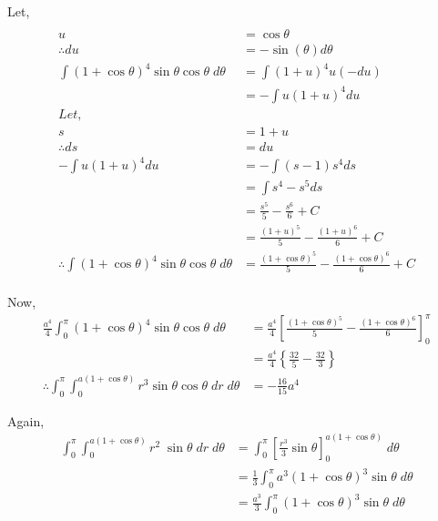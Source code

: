\documentclass{article}
\begin{document}
{Let,
\begin{align*}											& \\
    u															& = \cos \theta \\
    \therefore du												& = -\sin (\theta) d\theta \\
    \int (1+\cos \theta)^4 \sin \theta \cos \theta \; d\theta
    & = \int (1+u)^4 u (-du) \\
    & = -\int u(1+u)^4 du \\
    Let, \quad\quad												& \\
    s															& = 1+u \\
    \therefore ds												& = du \\
    -\int u(1+u)^4 du											& = -\int (s-1)s^4 ds \\
                                                                & = \int s^4 - s^5 ds \\
                                                                & = \frac{s^5}{5} - \frac{s^6}{6} + C \\
                                                                & = \frac{(1+u)^5}{5} - \frac{(1+u)^6}{6} + C \\
    \therefore \int (1+\cos \theta)^4 \sin \theta \cos \theta \; d\theta
                                                                & = \frac{(1+\cos \theta)^5}{5} - \frac{(1+\cos \theta)^6}{6} + C \\
\end{align*}

Now,
\begin{align*}
    \frac{a^4}{4} \int^\pi_0 (1+\cos \theta)^4 \sin \theta \cos \theta \; d\theta
    & = \frac{a^4}{4} \left[ \frac{(1+\cos \theta)^5}{5} - \frac{(1+\cos \theta)^6}{6} \right]^\pi_0 \\
    & = \frac{a^4}{4} \left\{ \frac{32}{5} - \frac{32}{3} \right\} \\
    \therefore \int^\pi_0 \int^{a(1+\cos \theta)}_0 r^3 \sin \theta \cos \theta \; dr \; d\theta
    & = -\frac{16}{15} a^4
\end{align*}

Again,
\begin{align*}
    \int^\pi_0 \int^{a(1+\cos \theta)}_0 r^2 \; \sin \theta \; dr \; d\theta
    & = \int^\pi_0 \left[ \frac{r^3}{3} \sin \theta \right]^{a(1+\cos \theta)}_0 \; d\theta \\
    & = \frac{1}{3} \int^\pi_0 a^3 (1+\cos \theta)^3 \sin \theta \; d\theta \\
    & = \frac{a^3}{3} \int^\pi_0 (1+\cos \theta)^3 \sin \theta \; d\theta \\
\end{align*}

}
\end{document}
